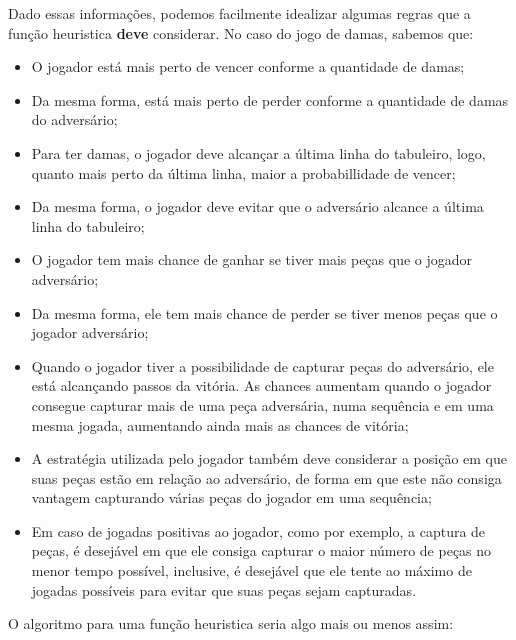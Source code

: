 \documentclass{article}
\begin{document}
    Dado essas informações, podemos facilmente idealizar algumas regras que a
    função heuristica \textbf{deve} considerar. No caso do jogo de damas,
    sabemos que:

    \begin{itemize}
        \item O jogador está mais perto de vencer conforme a quantidade de
            damas;
        \item Da mesma forma, está mais perto de perder conforme a quantidade
            de damas do adversário;
        \item Para ter damas, o jogador deve alcançar a última linha do
            tabuleiro, logo, quanto mais perto da última linha, maior a
            probabillidade de vencer;
        \item Da mesma forma, o jogador deve evitar que o adversário alcance a
            última linha do tabuleiro;
        \item O jogador tem mais chance de ganhar se tiver mais peças que o
            jogador adversário;
        \item Da mesma forma, ele tem mais chance de perder se tiver menos
            peças que o jogador adversário;
        \item Quando o jogador tiver a possibilidade de capturar peças do
            adversário, ele está alcançando passos da vitória. As chances
            aumentam quando o jogador consegue capturar mais de uma peça
            adversária, numa sequência e em uma mesma jogada, aumentando ainda
            mais as chances de vitória;
        \item A estratégia utilizada pelo jogador também deve considerar a
            posição em que suas peças estão em relação ao adversário, de forma
            em que este não consiga vantagem capturando várias peças do jogador
            em uma sequência;
        \item Em caso de jogadas positivas ao jogador, como por exemplo, a
            captura de peças, é desejável em que ele consiga capturar o maior
            número de peças no menor tempo possível, inclusive, é desejável que
            ele tente ao máximo de jogadas possíveis para evitar que suas peças
            sejam capturadas.
    \end{itemize}

    O algoritmo para uma função heuristica seria algo mais ou menos assim:
\end{document}
